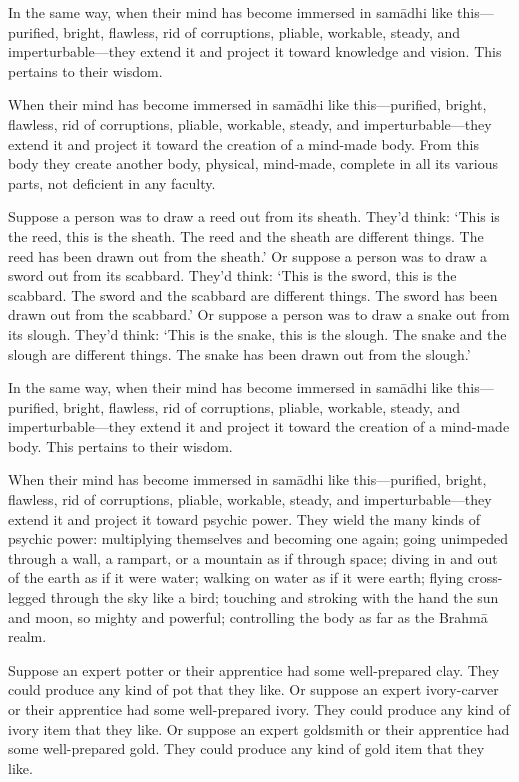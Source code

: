 \documentclass[12pt,openany]{book}%
\begin{document}
In the same way, when their mind has become immersed in \textsanskrit{samādhi} like this—purified, bright, flawless, rid of corruptions, pliable, workable, steady, and imperturbable—they extend it and project it toward knowledge and vision. This pertains to their wisdom. 

When their mind has become immersed in \textsanskrit{samādhi} like this—purified, bright, flawless, rid of corruptions, pliable, workable, steady, and imperturbable—they extend it and project it toward the creation of a mind-made body. From this body they create another body, physical, mind-made, complete in all its various parts, not deficient in any faculty. 

Suppose a person was to draw a reed out from its sheath. They’d think: ‘This is the reed, this is the sheath. The reed and the sheath are different things. The reed has been drawn out from the sheath.’ Or suppose a person was to draw a sword out from its scabbard. They’d think: ‘This is the sword, this is the scabbard. The sword and the scabbard are different things. The sword has been drawn out from the scabbard.’ Or suppose a person was to draw a snake out from its slough. They’d think: ‘This is the snake, this is the slough. The snake and the slough are different things. The snake has been drawn out from the slough.’ 

In the same way, when their mind has become immersed in \textsanskrit{samādhi} like this—purified, bright, flawless, rid of corruptions, pliable, workable, steady, and imperturbable—they extend it and project it toward the creation of a mind-made body. This pertains to their wisdom. 

When their mind has become immersed in \textsanskrit{samādhi} like this—purified, bright, flawless, rid of corruptions, pliable, workable, steady, and imperturbable—they extend it and project it toward psychic power. They wield the many kinds of psychic power: multiplying themselves and becoming one again; going unimpeded through a wall, a rampart, or a mountain as if through space; diving in and out of the earth as if it were water; walking on water as if it were earth; flying cross-legged through the sky like a bird; touching and stroking with the hand the sun and moon, so mighty and powerful; controlling the body as far as the \textsanskrit{Brahmā} realm. 

Suppose an expert potter or their apprentice had some well-prepared clay. They could produce any kind of pot that they like. Or suppose an expert ivory-carver or their apprentice had some well-prepared ivory. They could produce any kind of ivory item that they like. Or suppose an expert goldsmith or their apprentice had some well-prepared gold. They could produce any kind of gold item that they like. 
\end{document}
